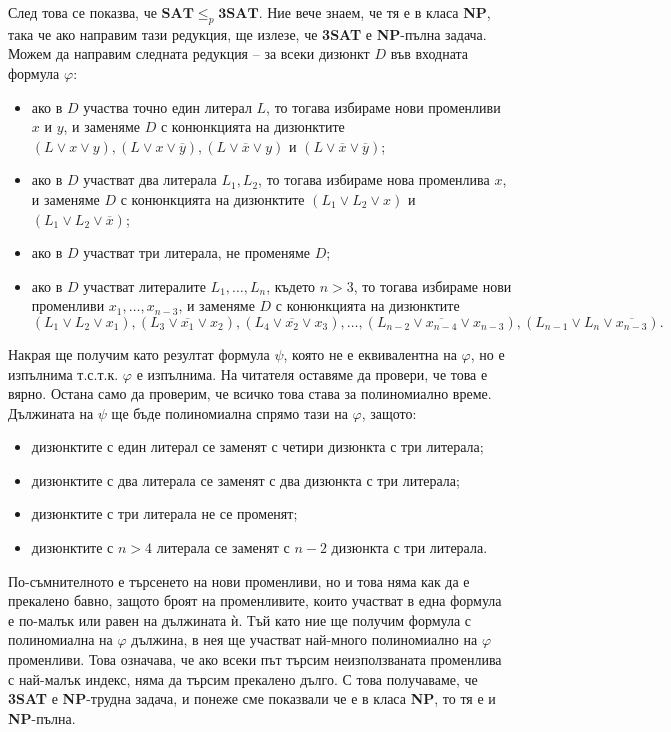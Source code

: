 \documentclass{article}
\newcommand{\NP}{\textbf{NP}}
\theoremstyle{definition}
\theoremstyle{plain}
\theoremstyle{remark}
\theoremstyle{definition}
\begin{document}
След това се показва, че $\mathbf{SAT} \leq_p \mathbf{3SAT}$.
Ние вече знаем, че тя е в класа \NP, така че ако направим тази редукция, ще излезе, че \textbf{3SAT} е \NP-пълна задача.
Можем да направим следната редукция -- за всеки дизюнкт $D$ във входната формула $\varphi$:
\begin{itemize}
    \item ако в $D$ участва точно един литерал $L$, то тогава избираме нови променливи $x$ и $y$, и заменяме $D$ с конюнкцията на дизюнктите $(L \lor x \lor y), (L \lor x \lor \overline{y}), (L \lor \overline{x} \lor y)$ и $(L \lor \overline{x} \lor \overline{y})$;
    \item ако в $D$ участват два литерала $L_1, L_2$, то тогава избираме нова променлива $x$, и заменяме $D$ с конюнкцията на дизюнктите $(L_1 \lor L_2 \lor x)$ и $(L_1 \lor L_2 \lor \overline{x})$;
    \item ако в $D$ участват три литерала, не променяме $D$;
    \item ако в $D$ участват литералите $L_1, \dots, L_n$, където $n > 3$, то тогава избираме нови променливи $x_1, \dots, x_{n - 3}$, и заменяме $D$ с конюнкцията на дизюнктите
          \[
              (L_1 \lor L_2 \lor x_1), (L_3 \lor \overline{x_1} \lor x_2), (L_4 \lor \overline{x_2} \lor x_3), \dots, (L_{n - 2} \lor \overline{x_{n - 4}} \lor x_{n - 3}), (L_{n - 1} \lor L_n \lor \overline{x_{n - 3}}).
          \]
\end{itemize}
Накрая ще получим като резултат формула $\psi$, която не е еквивалентна на $\varphi$, но е изпълнима т.с.т.к. $\varphi$ е изпълнима.
На читателя оставяме да провери, че това е вярно.
Остана само да проверим, че всичко това става за полиномиално време.
Дължината на $\psi$ ще бъде полиномиална спрямо тази на $\varphi$, защото:
\begin{itemize}
    \item дизюнктите с един литерал се заменят с четири дизюнкта с три литерала;
    \item дизюнктите с два литерала се заменят с два дизюнкта с три литерала;
    \item дизюнктите с три литерала не се променят;
    \item дизюнктите с $n > 4$ литерала се заменят с $n - 2$ дизюнкта с три литерала.
\end{itemize}
По-съмнителното е търсенето на нови променливи, но и това няма как да е прекалено бавно, защото броят на променливите, които участват в една формула е по-малък или равен на дължината ѝ.
Тъй като ние ще получим формула с полиномиална на $\varphi$ дължина, в нея ще участват най-много полиномиално на $\varphi$ променливи.
Това означава, че ако всеки път търсим неизползваната променлива с най-малък индекс, няма да търсим прекалено дълго.
С това получаваме, че \textbf{3SAT} е \NP-трудна задача, и понеже сме показвали че е в класа \NP, то тя е и \NP-пълна.
\end{document}
